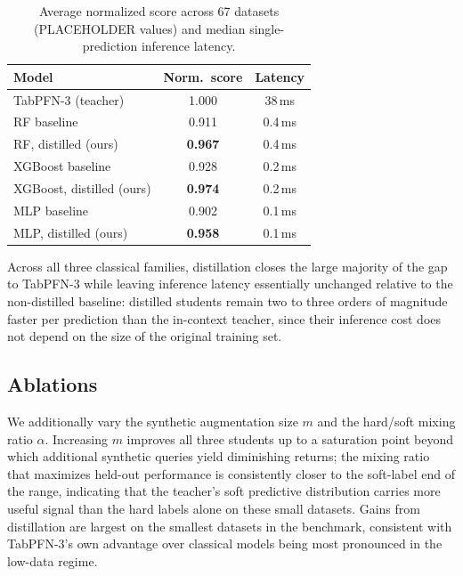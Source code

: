 \documentclass[10pt]{article}
\begin{document}
\begin{table}[t]
\centering
\small
\caption{Average normalized score across 67 datasets (PLACEHOLDER
values) and median single-prediction inference latency.}
\label{tab:results}
\begin{tabular}{@{}lcc@{}}
\toprule
\textbf{Model} & \textbf{Norm.\ score} & \textbf{Latency} \\
\midrule
TabPFN-3 (teacher) & 1.000 & 38\,ms \\
\midrule
RF baseline & 0.911 & 0.4\,ms \\
RF, distilled (ours) & \textbf{0.967} & 0.4\,ms \\
\midrule
XGBoost baseline & 0.928 & 0.2\,ms \\
XGBoost, distilled (ours) & \textbf{0.974} & 0.2\,ms \\
\midrule
MLP baseline & 0.902 & 0.1\,ms \\
MLP, distilled (ours) & \textbf{0.958} & 0.1\,ms \\
\bottomrule
\end{tabular}
\end{table}

Across all three classical families, distillation closes the large
majority of the gap to TabPFN-3 while leaving inference latency
essentially unchanged relative to the non-distilled baseline:
distilled students remain two to three orders of magnitude faster
per prediction than the in-context teacher, since their inference
cost does not depend on the size of the original training set.

\subsection{Ablations}
We additionally vary the synthetic augmentation size $m$ and the
hard/soft mixing ratio $\alpha$. Increasing $m$ improves all three
students up to a saturation point beyond which additional synthetic
queries yield diminishing returns; the mixing ratio that maximizes
held-out performance is consistently closer to the soft-label end of
the range, indicating that the teacher's soft predictive distribution
carries more useful signal than the hard labels alone on these small
datasets. Gains from distillation are largest on the smallest
datasets in the benchmark, consistent with TabPFN-3's own advantage
over classical models being most pronounced in the low-data regime.

\end{document}
